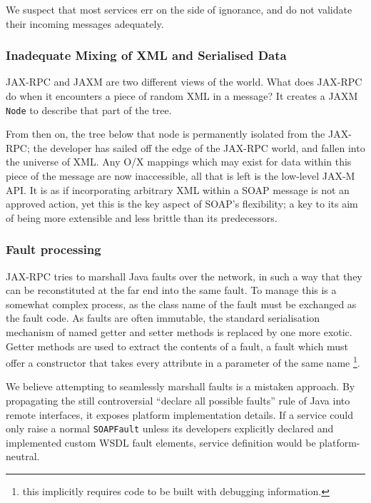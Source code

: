 We suspect that most services err on the side of ignorance, and do not
validate their incoming messages adequately.


\subsubsection{Inadequate Mixing of XML and Serialised Data}
\label{objections:o-x:mixing}

JAX-RPC and JAXM are two different views of the world. What does JAX-RPC
do when it encounters a piece of random XML in a message? It creates a
JAXM {\tt Node} to describe that part of the tree.

From then on, the tree below that node is permanently isolated from the
JAX-RPC; the developer has sailed off the edge of the JAX-RPC world, and
fallen into the universe of XML. Any O/X mappings which may exist for data
within this piece of the message are now inaccessible, all that is left
is the low-level JAX-M API. It is as if incorporating arbitrary XML
within a SOAP message is not an approved action, yet this is the key
aspect of SOAP's flexibility; a key to its aim of being more extensible
and less brittle than its predecessors.


\subsubsection{Fault processing}
\label{objections:soap-not-rmi:faults}

JAX-RPC tries to marshall Java faults over the network, in such a way
that they can be reconstituted at the far end into the same fault. To
manage this is a somewhat complex process, as the class name of the
fault must be exchanged as the fault code. As faults are often
immutable, the standard serialisation mechanism of named getter and
setter methods is replaced by one more exotic. Getter methods are used
to extract the contents of a fault, a fault which must offer a
constructor that takes every attribute in a parameter of the same name
\footnote{this implicitly requires code to be built with debugging
information.}.

We believe attempting to seamlessly marshall faults is a mistaken
approach.  By propagating the still controversial ``declare all
possible faults'' rule of Java into remote interfaces, it exposes
platform implementation details. If a service could only raise a
normal {\tt SOAPFault} unless its developers explicitly declared and
implemented custom WSDL fault elements, service definition would be
platform-neutral.

